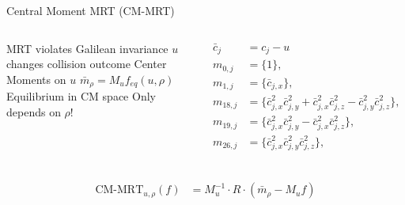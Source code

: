 \placelogofalse
\begin{frame}{Central Moment MRT (CM-MRT)}
\begin{columns}
\begin{outline}
\1 MRT violates Galilean invariance 
\2 $u$ changes collision outcome
\1 Center Moments on $u$ \cite{De2017}
\1 $\bar{m}_{\rho} = M_u f_{eq}(u, \rho)$
\2 Equilibrium in CM space
\2 Only depends on $\rho$!
\end{outline}
\begin{center}
\begin{align*}
\bar{c}_j &= c_j - u \\
m_{0,j} &= \{  1 \},\\
m_{1,j} &= \{  \bar{c}_{j,x} \}, \\
m_{18,j} &= \{ \bar{c}_{j,x}^2 \bar{c}_{j,y}^2 + \bar{c}_{j,x}^2 \bar{c}_{j,z}^2 - \bar{c}_{j,y}^2 \bar{c}_{j,z}^2 \}, \\
m_{19,j} &= \{ \bar{c}_{j,x}^2 \bar{c}_{j,y}^2 - \bar{c}_{j,x}^2 \bar{c}_{j,z}^2 \},\\
m_{26,j} &= \{ \bar{c}_{j,x}^2 \bar{c}_{j,y}^2 \bar{c}_{j,z}^2 \},\\
\end{align*}
\end{center}
\end{columns}
\begin{center}
  \begin{align*}
\text{CM-MRT}_{u,\rho}(f) &= M_u^{-1} \cdot R \cdot (\bar{m}_{\rho} - M_u f)
\end{align*}
\end{center}
\end{frame}
\placelogotrue

